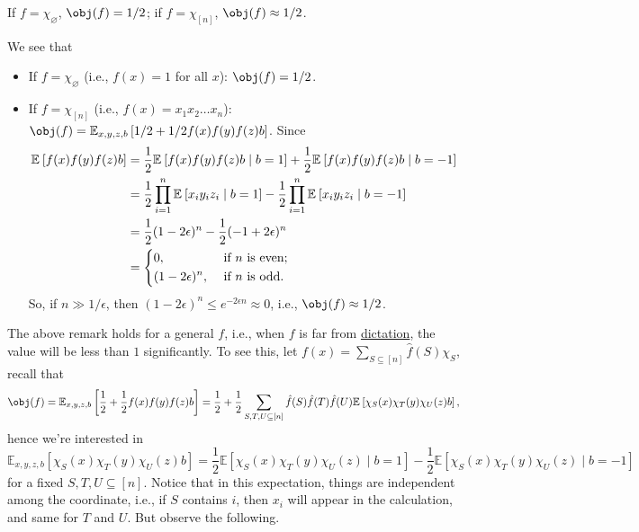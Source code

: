 \begin{remark}
	If \(f = \chi _\varnothing \), \(\obj(f) = 1/2\); if \(f = \chi _{[n]}\), \(\obj(f) \approx 1 / 2\).
\end{remark}
\begin{explanation}
	We see that
	\begin{itemize}
		\item If \(f = \chi _\varnothing \) (i.e., \(f(x) = 1\) for all \(x\)): \(\obj(f) = 1 / 2\).
		\item If \(f = \chi _{[n]}\) (i.e., \(f(x) = x_1 x_2 \dots  x_n\)): \(\obj(f) = \mathbb{E}_{x, y, z, b}\left[1 / 2 + 1 / 2 f(x)f(y)f(z)b \right] \). Since
		      \[
			      \begin{split}
				      \mathbb{E}_{}\left[f(x) f(y) f(z) b \right]
				       & = \frac{1}{2} \mathbb{E}_{}\left[f(x) f(y) f(z) b \mid b = 1 \right] + \frac{1}{2} \mathbb{E}_{}\left[f(x) f(y) f(z) b \mid b = -1 \right]                       \\
				       & = \frac{1}{2} \prod_{i=1}^{n} \mathbb{E}_{}\left[x_i y_i z_i \mid b = 1 \right] - \frac{1}{2} \prod_{i=1}^{n} \mathbb{E}_{}\left[x_i y_i z_i \mid b = -1 \right] \\
				       & = \frac{1}{2} (1 - 2 \epsilon )^n - \frac{1}{2} (-1 + 2\epsilon )^n                                                                                              \\
				       & = \begin{dcases}
					           0,                & \text{ if \(n\) is even}  ; \\
					           (1-2\epsilon )^n, & \text{ if \(n\) is odd}.
				           \end{dcases}
			      \end{split}
		      \]
		      So, if \(n \gg 1 / \epsilon \), then \((1 - 2 \epsilon )^n \leq e^{-2 \epsilon n} \approx 0\), i.e., \(\obj(f) \approx 1 / 2\).
	\end{itemize}
\end{explanation}

The above remark holds for a general \(f\), i.e., when \(f\) is far from \hyperref[def:dictation]{dictation}, the value will be less than \(1\) significantly. To see this, let \(f(x) = \sum_{S \subseteq [n]} \hat{f} (S)\chi _S\), recall that
\[
	\obj(f)
	= \mathbb{E}_{x, y, z, b}\left[\frac{1}{2} + \frac{1}{2} f(x) f(y) f(z) b \right]
	= \frac{1}{2} + \frac{1}{2} \sum_{S, T, U \subseteq [n]} \hat{f} (S) \hat{f} (T) \hat{f} (U) \mathbb{E}_{}\left[\chi _S(x) \chi _T(y) \chi _U(z) b \right],
\]
hence we're interested in
\[
	\mathbb{E}_{x, y, z, b}\left[\chi _S(x) \chi _T(y) \chi _U (z) b \right]
	= \frac{1}{2} \mathbb{E}\left[\chi _S(x) \chi _T(y) \chi _U (z) \mid b=1\right] - \frac{1}{2} \mathbb{E}\left[\chi _S(x) \chi _T(y) \chi _U (z) \mid b=-1\right]
\]
for a fixed \(S, T, U \subseteq [n]\). Notice that in this expectation, things are independent among the coordinate, i.e., if \(S\) contains \(i\), then \(x_i\) will appear in the calculation, and same for \(T\) and \(U\). But observe the following.

